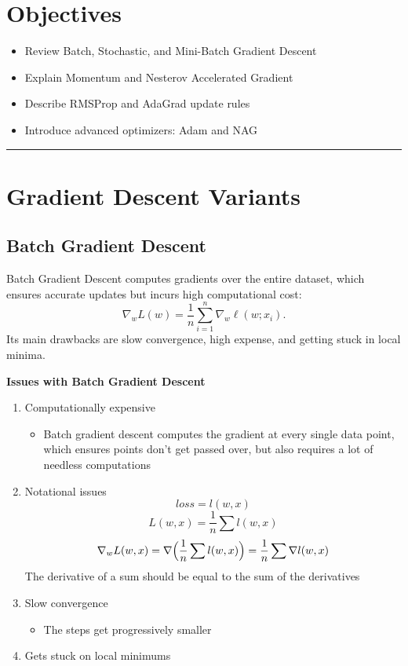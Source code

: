 
\section*{Objectives}
\begin{itemize}
  \item Review Batch, Stochastic, and Mini-Batch Gradient Descent
  \item Explain Momentum and Nesterov Accelerated Gradient
  \item Describe RMSProp and AdaGrad update rules
  \item Introduce advanced optimizers: Adam and NAG
\end{itemize}

\rule[0.0051in]{\textwidth}{0.00025in}
\section{Gradient Descent Variants}
\subsection{Batch Gradient Descent}
Batch Gradient Descent computes gradients over the entire dataset, which ensures accurate updates but incurs high computational cost:
\[ 
\nabla_w L(w)=\frac{1}{n}\sum_{i=1}^n\nabla_w \ell(w; x_i). 
\]
Its main drawbacks are slow convergence, high expense, and getting stuck in local minima.

\textbf{Issues with Batch Gradient Descent}
\begin{enumerate}
    \item Computationally expensive
    \begin{itemize}
        \item Batch gradient descent computes the gradient at every single data point, which ensures points don't get passed over, but also requires a lot of needless computations
    \end{itemize} 
    \item Notational issues
    \[
    loss = l(w,x)
    \]
    \[
    L(w,x) = \frac{1}{n} \sum l(w,x)
    \]
    \[
    \nabla_w L(w,x)=\nabla \Bigl(\frac{1}{n} \sum l(w,x)\Bigr) = \frac{1}{n} \sum \nabla l(w,x)
    \]
    The derivative of a sum should be equal to the sum of the derivatives
    \item Slow convergence
    \begin{itemize}
        \item The steps get progressively smaller
    \end{itemize}
    \item Gets stuck on local minimums
\end{enumerate}


